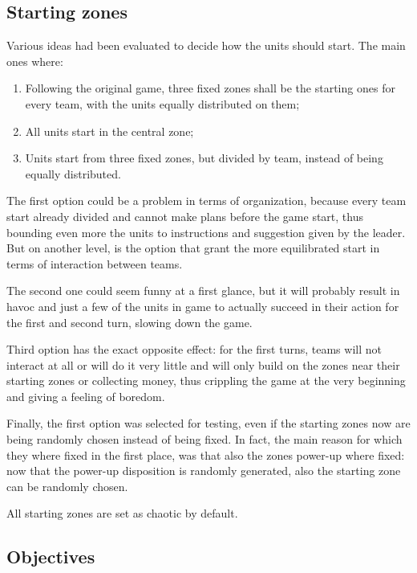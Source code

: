 		\subsection{Starting zones}
			
			Various ideas had been evaluated to decide how the units should start.
			The main ones where: 
			
			\begin{enumerate}
				\item Following the original game, three fixed zones shall be the starting ones for every team, with the units equally distributed on them;
				\item All units start in the central zone;
				\item Units start from three fixed zones, but divided by team, instead of being equally distributed.
			\end{enumerate}
			
			The first option could be a problem in terms of organization, because every team start already divided and cannot make plans before the game start, thus bounding even more the units to instructions and suggestion given by the leader.
			But on another level, is the option that grant the more equilibrated start in terms of interaction between teams.
			
			The second one could seem funny at a first glance, but it will probably result in havoc and just a few of the units in game to actually succeed in their action for the first and second turn, slowing down the game.
			
			Third option has the exact opposite effect: for the first turns, teams will not interact at all or will do it very little and will only build on the zones near their starting zones or collecting money, thus crippling the game at the very beginning and giving a feeling of boredom. 
			
			Finally, the first option was selected for testing, even if the starting zones now are being randomly chosen instead of being fixed.
			In fact, the main reason for which they where fixed in the first place, was that also the zones power-up where fixed: now that the power-up disposition is randomly generated, also the starting zone can be randomly chosen.
			
			All starting zones are set as chaotic by default.
		
		\subsection{Objectives}
			
